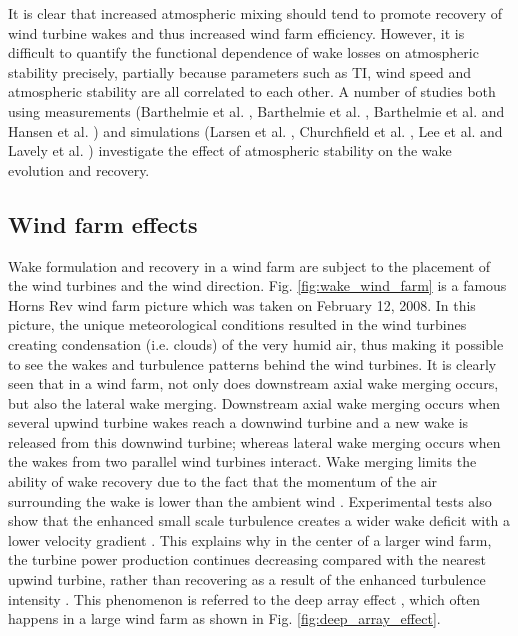 \documentclass{umthesis}
\begin{document}
It is clear that increased atmospheric mixing should tend to promote recovery of wind turbine wakes and thus increased wind farm efficiency. However, it is difficult to quantify the functional dependence of wake losses on atmospheric stability precisely, partially because parameters such as TI, wind speed and atmospheric stability are all correlated to each other. A number of studies both using measurements (Barthelmie et al. \cite{barthelmie_modelling_2009}, Barthelmie et al. \cite{Barthelmie_wakes_2009}, Barthelmie et al. \cite{Ten_years} and Hansen et al. \cite{hansen_impact_2012}) and simulations (Larsen et al. \cite{Larsen_2009}, Churchfield et al. \cite{Churchfield_2012}, Lee et al. \cite{Lee_2014} and Lavely et al. \cite{Lavely_2011}) investigate the effect of atmospheric stability on the wake evolution and recovery.


\subsection{Wind farm effects}
Wake formulation and recovery in a wind farm are subject to the placement of the wind turbines and the wind direction. Fig. \ref{fig:wake_wind_farm} is a famous Horns Rev wind farm picture which was taken on February 12, 2008. In this picture, the unique meteorological conditions resulted in the wind turbines creating condensation (i.e. clouds) of the very humid air, thus making it possible to see the wakes and turbulence patterns behind the wind turbines. It is clearly seen that in a wind farm, not only does downstream axial wake merging occurs, but also the lateral wake merging. Downstream axial wake merging occurs when several upwind turbine wakes reach a downwind turbine and a new wake is released from this downwind turbine; whereas lateral wake merging occurs when the wakes from two parallel wind turbines interact. Wake merging limits the ability of wake recovery due to the fact that the momentum of the air surrounding the wake is lower than the ambient wind \cite{Barthelmie_2011_Meteorological}. Experimental tests also show that the enhanced small scale turbulence creates a wider wake deficit with a lower velocity gradient \cite{Barthelmie_2011_Meteorological}\cite{Méchali}. This explains why in the center of a larger wind farm, the turbine power production continues decreasing compared with the nearest upwind turbine, rather than recovering as a result of the enhanced turbulence intensity \cite{Hao}. This phenomenon is referred to the deep array effect \cite{Barthelmie_Evaluation}\cite{Frandsen_2007}\cite{meyers_optimal_2012}\cite{Smith_2011}\cite{Schlez_2009}\cite{Andersen_2011}\cite{Calaf_2010}, which often happens in a large wind farm as shown in Fig. \ref{fig:deep_array_effect}.
\end{document}
